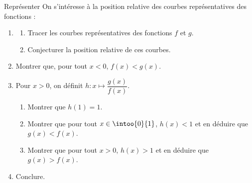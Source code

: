 \begin{exo}{Représenter}
	On s'intéresse à la position relative des courbes représentatives des fonctions : 
	\begin{enumerate}
		\item
		      \begin{enumerate}
			      \item Tracer les courbes représentatives des fonctions $f$ et $g$.
			      \item Conjecturer la position relative de ces courbes.
		      \end{enumerate}
		\item Montrer que, pour tout $x < 0$, $f(x) < g(x)$.
		\item Pour $x > 0$, on définit $h : x \mapsto \dfrac{g(x)}{f(x)}$.
		      \begin{enumerate}
			      \item Montrer que $h(1) = 1$.
			      \item Montrer que pour tout $x \in \intoo{0}{1}$, $h(x) < 1$ et en déduire que $g(x) < f(x)$.
			      \item Montrer que pour tout $x > 0$, $h(x) > 1$ et en déduire que $g(x) > f(x)$.
		      \end{enumerate}
		\item Conclure.
	\end{enumerate}
\end{exo}

